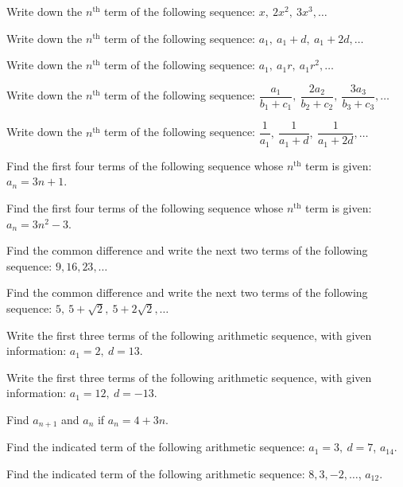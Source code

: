 \documentclass[11pt,a4paper]{article}
\begin{document}
\begin{shortlist}
\item Write down the $n^{\text{th}}$ term of the following sequence: $x,\ 2x^2,\ 3x^3,\ldots$

\item Write down the $n^{\text{th}}$ term of the following sequence: $a_1,\ a_1+d,\ a_1+2d,\ldots$

\item Write down the $n^{\text{th}}$ term of the following sequence: $a_1,\ a_1r,\ a_1r^2,\ldots$

\item Write down the $n^{\text{th}}$ term of the following sequence: $\dfrac{a_1}{b_1+c_1},\ \dfrac{2a_2}{b_2+c_2},\ \dfrac{3a_3}{b_3+c_3},\ldots$

\item Write down the $n^{\text{th}}$ term of the following sequence: $\dfrac{1}{a_1},\ \dfrac{1}{a_1+d},\ \dfrac{1}{a_1+2d},\ldots$

\item Find the first four terms of the following sequence whose $n^{\text{th}}$ term is given: $a_n=3n+1$.

\item Find the first four terms of the following sequence whose $n^{\text{th}}$ term is given: $a_n=3n^2-3$.

\item Find the common difference and write the next two terms of the following sequence: $9,16,23,\ldots$

\item Find the common difference and write the next two terms of the following sequence: $5,\ 5+\sqrt{2},\ 5+2\sqrt{2},\ldots$

\item Write the first three terms of the following arithmetic sequence, with given information: $a_1=2,\ d=13$.

\item Write the first three terms of the following arithmetic sequence, with given information: $a_1=12,\ d=-13$.

\item Find $a_{n+1}$ and $a_n$ if $a_n=4+3n$.

\item Find the indicated term of the following arithmetic sequence: $a_1=3,\ d=7$, $a_{14}$.

\item Find the indicated term of the following arithmetic sequence: $8,3,-2,\ldots$, $a_{12}$.


\end{shortlist}
\end{document}
